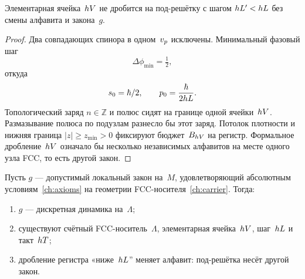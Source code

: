 \begin{lemma}
\label{lem:register-atom}
Элементарная ячейка~$hV$ не дробится
на под-решётку с шагом $hL'<hL$ без смены алфавита и закона~$g$.
\end{lemma}

\begin{proof}
Два совпадающих спинора в одном~$v_p$ исключены.
Минимальный фазовый шаг
\[
  \Delta\phi_{\min}=\tfrac12,
\]
откуда
\[
  s_0=\hbar/2,\qquad p_0=\frac{\hbar}{2hL}.
\]
Топологический заряд $n\in\mathbb{Z}$ и полюс сидят на границе одной ячейки~$hV$.
Размазывание полюса по подузлам разнесло бы этот заряд.
Потолок плотности и нижняя граница $|z|\ge z_{\min}>0$ фиксируют бюджет~$B_{hV}$ на регистр.
Формальное дробление~$hV$ означало бы несколько независимых алфавитов на месте одного узла FCC, то есть другой закон.
\end{proof}

\begin{theorem}
\label{thm:discreteness}
Пусть $g$ --- допустимый локальный закон на~$M$,
удовлетворяющий абсолютным условиям~\cref{ch:axioms} на геометрии FCC-носителя~\cref{ch:carrier}.
Тогда:
\begin{enumerate}[label=(\roman*)]
\item $g$ --- дискретная динамика на~$\Lambda$;
\item существуют счётный FCC-носитель~$\Lambda$, элементарная ячейка~$hV$, шаг~$hL$ и такт~$hT$;
\item дробление регистра «ниже~$hL$'' меняет алфавит: под-решётка несёт другой закон.
\end{enumerate}
\end{theorem}


